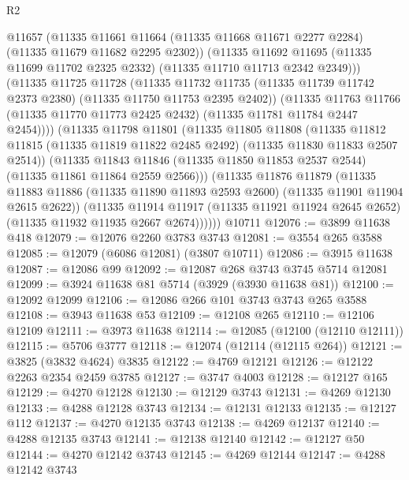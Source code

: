 \begin{lexlean}{R2}
\begin{coremodule}
            @11657
            (@11335
              @11661
              @11664
              (@11335 @11668 @11671 @2277 @2284)
              (@11335 @11679 @11682 @2295 @2302))
            (@11335
              @11692
              @11695
              (@11335 @11699 @11702 @2325 @2332)
              (@11335 @11710 @11713 @2342 @2349)))
          (@11335
            @11725
            @11728
            (@11335
              @11732
              @11735
              (@11335 @11739 @11742 @2373 @2380)
              (@11335 @11750 @11753 @2395 @2402))
            (@11335
              @11763
              @11766
              (@11335 @11770 @11773 @2425 @2432)
              (@11335 @11781 @11784 @2447 @2454))))
        (@11335
          @11798
          @11801
          (@11335
            @11805
            @11808
            (@11335
              @11812
              @11815
              (@11335 @11819 @11822 @2485 @2492)
              (@11335 @11830 @11833 @2507 @2514))
            (@11335
              @11843
              @11846
              (@11335 @11850 @11853 @2537 @2544)
              (@11335 @11861 @11864 @2559 @2566)))
          (@11335
            @11876
            @11879
            (@11335
              @11883
              @11886
              (@11335 @11890 @11893 @2593 @2600)
              (@11335 @11901 @11904 @2615 @2622))
            (@11335
              @11914
              @11917
              (@11335 @11921 @11924 @2645 @2652)
              (@11335 @11932 @11935 @2667 @2674))))))
    @10711
@12076 := @3899 @11638 @418
@12079 := @12076 @2260 @3783 @3743
@12081 := @3554 @265 @3588
@12085 := @12079 (@6086 @12081) (@3807 @10711)
@12086 := @3915 @11638
@12087 := @12086 @99
@12092 := @12087 @268 @3743 @3745 @5714 @12081
@12099 := @3924 @11638 @81 @5714 (@3929 (@3930 @11638 @81))
@12100 := @12092 @12099
@12106 := @12086 @266 @101 @3743 @3743 @265 @3588
@12108 := @3943 @11638 @53
@12109 := @12108 @265
@12110 := @12106 @12109
@12111 := @3973 @11638
@12114 := @12085 (@12100 (@12110 @12111))
@12115 := @5706 @3777
@12118 := @12074 (@12114 (@12115 @264))
@12121 := @3825 (@3832 @4624) @3835
@12122 := @4769 @12121
@12126 := @12122 @2263 @2354 @2459 @3785
@12127 := @3747 @4003
@12128 := @12127 @165
@12129 := @4270 @12128
@12130 := @12129 @3743
@12131 := @4269 @12130
@12133 := @4288 @12128 @3743
@12134 := @12131 @12133
@12135 := @12127 @112
@12137 := @4270 @12135 @3743
@12138 := @4269 @12137
@12140 := @4288 @12135 @3743
@12141 := @12138 @12140
@12142 := @12127 @50
@12144 := @4270 @12142 @3743
@12145 := @4269 @12144
@12147 := @4288 @12142 @3743

\end{coremodule}
\end{lexlean}
